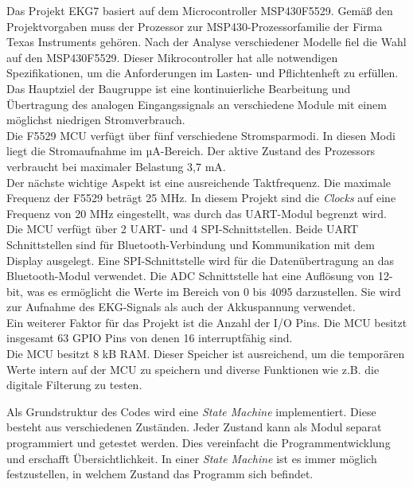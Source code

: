 Das Projekt EKG7 basiert auf dem Microcontroller MSP430F5529. \cite{MSP430F5529} Gemäß den Projektvorgaben muss der Prozessor zur MSP430-Prozessorfamilie der Firma Texas Instruments gehören. Nach der Analyse verschiedener Modelle fiel die Wahl auf den MSP430F5529. Dieser Mikrocontroller hat alle notwendigen Spezifikationen, um die Anforderungen im Lasten- und Pflichtenheft zu erfüllen.\\
Das Hauptziel der Baugruppe ist eine kontinuierliche Bearbeitung und Übertragung des analogen Eingangssignals an verschiedene Module mit einem möglichst niedrigen Stromverbrauch.\\
Die F5529 MCU verfügt über fünf verschiedene Stromsparmodi. In diesen Modi liegt die Stromaufnahme im µA-Bereich. Der aktive Zustand des Prozessors verbraucht bei maximaler Belastung 3,7 mA. \cite{Datenblatt_MSP430F5529}\\
Der nächste wichtige Aspekt ist eine ausreichende Taktfrequenz. Die maximale Frequenz der F5529 beträgt 25 MHz. In diesem Projekt sind die \textit{Clocks} auf eine Frequenz von 20 MHz eingestellt, was durch das UART-Modul begrenzt wird.\\
Die MCU verfügt über 2 UART- und 4 SPI-Schnittstellen. Beide UART Schnittstellen sind für Bluetooth-Verbindung und Kommunikation mit dem Display ausgelegt. Eine SPI-Schnittstelle wird für die Datenübertragung an das Bluetooth-Modul verwendet.
Die ADC Schnittstelle hat eine Auflösung von 12-bit, was es ermöglicht die Werte im Bereich von 0 bis 4095 darzustellen. Sie wird zur Aufnahme des EKG-Signals als auch der Akkuspannung verwendet.\\ 
Ein weiterer Faktor für das Projekt ist die Anzahl der I/O Pins. Die MCU besitzt insgesamt 63 GPIO Pins von denen 16 interruptfähig sind.\\
Die MCU besitzt 8 kB RAM. Dieser Speicher ist ausreichend, um die temporären Werte intern auf der MCU zu speichern und diverse Funktionen wie z.B. die digitale Filterung zu testen.

Als Grundstruktur des Codes wird eine \textit{State Machine} implementiert. Diese besteht aus verschiedenen Zuständen. Jeder Zustand kann als Modul separat programmiert und getestet werden. Dies vereinfacht die Programmentwicklung und erschafft Übersichtlichkeit. In einer \textit{State Machine} ist es immer möglich festzustellen, in welchem Zustand das Programm sich befindet.



